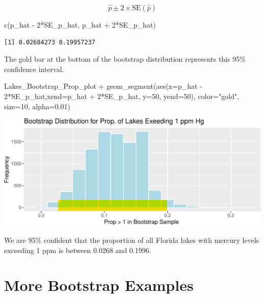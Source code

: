\documentclass[
  letterpaper,
  DIV=11,
  numbers=noendperiod]{scrreprt}
\newenvironment{Shaded}{\begin{snugshade}}{\end{snugshade}}
\newcommand{\AttributeTok}[1]{\textcolor[rgb]{0.40,0.45,0.13}{#1}}
\newcommand{\DecValTok}[1]{\textcolor[rgb]{0.68,0.00,0.00}{#1}}
\newcommand{\FloatTok}[1]{\textcolor[rgb]{0.68,0.00,0.00}{#1}}
\newcommand{\FunctionTok}[1]{\textcolor[rgb]{0.28,0.35,0.67}{#1}}
\newcommand{\NormalTok}[1]{\textcolor[rgb]{0.00,0.23,0.31}{#1}}
\newcommand{\SpecialCharTok}[1]{\textcolor[rgb]{0.37,0.37,0.37}{#1}}
\newcommand{\StringTok}[1]{\textcolor[rgb]{0.13,0.47,0.30}{#1}}
\begin{document}
\[
\hat{p} \pm 2\times\text{SE}(\hat{p})
\]

\begin{Shaded}
\begin{Highlighting}[]
\FunctionTok{c}\NormalTok{(p\_hat }\SpecialCharTok{{-}} \DecValTok{2}\SpecialCharTok{*}\NormalTok{SE\_p\_hat, p\_hat }\SpecialCharTok{+} \DecValTok{2}\SpecialCharTok{*}\NormalTok{SE\_p\_hat)}
\end{Highlighting}
\end{Shaded}

\begin{verbatim}
[1] 0.02684273 0.19957237
\end{verbatim}

The gold bar at the bottom of the bootstrap distribution represents this
95\% confidence interval.

\begin{Shaded}
\begin{Highlighting}[]
\NormalTok{Lakes\_Bootstrap\_Prop\_plot }\SpecialCharTok{+} 
  \FunctionTok{geom\_segment}\NormalTok{(}\FunctionTok{aes}\NormalTok{(}\AttributeTok{x=}\NormalTok{p\_hat }\SpecialCharTok{{-}} \DecValTok{2}\SpecialCharTok{*}\NormalTok{SE\_p\_hat,}\AttributeTok{xend=}\NormalTok{p\_hat }\SpecialCharTok{+} \DecValTok{2}\SpecialCharTok{*}\NormalTok{SE\_p\_hat, }\AttributeTok{y=}\DecValTok{50}\NormalTok{, }\AttributeTok{yend=}\DecValTok{50}\NormalTok{),}
               \AttributeTok{color=}\StringTok{"gold"}\NormalTok{, }\AttributeTok{size=}\DecValTok{10}\NormalTok{, }\AttributeTok{alpha=}\FloatTok{0.01}\NormalTok{) }
\end{Highlighting}
\end{Shaded}

\includegraphics{Ch3_files/figure-pdf/unnamed-chunk-60-1.pdf}

We are 95\% confident that the proportion of all Florida lakes with
mercury levels exceeding 1 ppm is between 0.0268 and 0.1996.

\section{More Bootstrap Examples}\label{more-bootstrap-examples}
\end{document}
